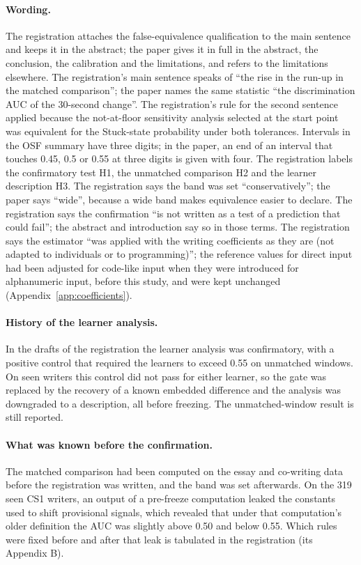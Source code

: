 \paragraph{Wording.} The registration attaches the false-equivalence qualification to the main sentence and keeps it in
the abstract; the paper gives it in full in the abstract, the conclusion, the calibration and the limitations, and
refers to the limitations elsewhere. The registration's main sentence speaks of ``the rise in the run-up in the matched comparison'';
the paper names the same statistic ``the discrimination AUC of the 30-second change''. The registration's rule for the
second sentence applied because the not-at-floor sensitivity analysis selected at the start point was equivalent for
the Stuck-state probability under both tolerances. Intervals in the OSF summary have three digits; in the paper, an end
of an interval that touches 0.45, 0.5 or 0.55 at three digits is given with four. The registration labels the
confirmatory test H1, the unmatched comparison H2 and the learner description H3. The registration says the band was set
``conservatively''; the paper says ``wide'', because a wide band makes equivalence easier to declare. The registration
says the confirmation ``is not written as a test of a prediction that could fail''; the abstract and introduction say
so in those terms. The registration says the estimator ``was applied with the writing coefficients as they are (not
adapted to individuals or to programming)''; the reference values for direct input had been adjusted for code-like
input when they were introduced for alphanumeric input, before this study, and were kept unchanged
(Appendix~\ref{app:coefficients}).

\paragraph{History of the learner analysis.} In the drafts of the registration the learner analysis was confirmatory,
with a positive control that required the learners to exceed 0.55 on unmatched windows. On seen writers this control
did not pass for either learner, so the gate was replaced by the recovery of a known embedded difference and the
analysis was downgraded to a description, all before freezing. The unmatched-window result is still reported.

\paragraph{What was known before the confirmation.} The matched comparison had been computed on the essay and co-writing
data before the registration was written, and the band was set afterwards. On the 319 seen CS1 writers, an output of a
pre-freeze computation leaked the constants used to shift provisional signals, which revealed that under that
computation's older definition the AUC was slightly above 0.50 and below 0.55. Which rules were fixed before and after
that leak is tabulated in the registration (its Appendix B).

